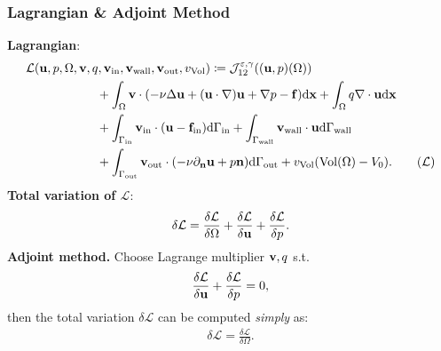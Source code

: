 \documentclass[10pt,xcolor=table,english]{beamer}   %
\begin{document}
\begin{frame}
    \frametitle{Lagrangian \& Adjoint Method}
    \textbf{Lagrangian}:
    \begin{align}
    &\mathcal{L}({\bf u},p,\Omega,{\bf v},q,{\bf v}_{\rm in},{\bf v}_{\rm wall},{\bf v}_{\rm out},v_{\rm Vol})\coloneqq\mathcal{J}_{12}^{\varepsilon,\gamma}(({\bf u},p)(\Omega)) \nonumber\\
    &\hspace{2cm} + \int_\Omega {\bf v}\cdot(-\nu\Delta{\bf u} + ({\bf u}\cdot\nabla){\bf u} + \nabla p - {\bf f}){\rm d}{\bf x} + \int_\Omega q\nabla\cdot{\bf u}{\rm d}{\bf x} \nonumber\\
    &\hspace{2cm} + \int_{\Gamma_{\rm in}} {\bf v}_{\rm in}\cdot({\bf u} - {\bf f}_{\rm in}){\rm d}\Gamma_{\rm in} + \int_{\Gamma_{\rm wall}} {\bf v}_{\rm wall}\cdot{\bf u}{\rm d}\Gamma_{\rm wall} \nonumber\\
    &\hspace{2cm} + \int_{\Gamma_{\rm out}} {\bf v}_{\rm out}\cdot(-\nu\partial_{\bf n}{\bf u} + p{\bf n}){\rm d}\Gamma_{\rm out} + v_{\rm Vol}({\rm Vol}(\Omega) - V_0).\label{Lagrangian}\tag{$\mathcal{L}$}
    \end{align}
    \textbf{Total variation of $\mathcal{L}$}:
    \begin{align*}
    \delta\mathcal{L} = \frac{\delta\mathcal{L}}{\delta\Omega} + \frac{\delta\mathcal{L}}{\delta{\bf u}} + \frac{\delta\mathcal{L}}{\delta p}.
    \end{align*}
    \textbf{Adjoint method.} Choose Lagrange multiplier ${\bf v},q$ s.t.
    \begin{align*}
    \frac{\delta\mathcal{L}}{\delta{\bf u}} + \frac{\delta\mathcal{L}}{\delta p} = 0,
    \end{align*}
    then the total variation $\delta\mathcal{L}$ can be computed \textit{simply} as:
    \begin{align*}
    \delta\mathcal{L} = \frac{\delta\mathcal{L}}{\delta\Omega}.
    \end{align*}
\end{frame}
\end{document}
